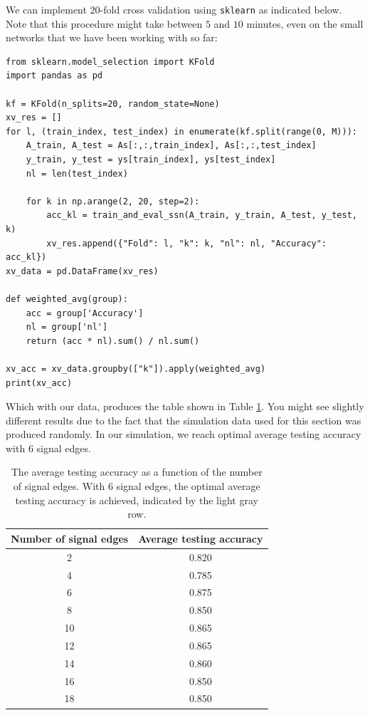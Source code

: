 We can implement $20$-fold cross validation using \texttt{sklearn} as indicated below. Note that this procedure might take between $5$ and $10$ minutes, even on the small networks that we have been working with so far:

\begin{lstlisting}[style=python]
from sklearn.model_selection import KFold
import pandas as pd

kf = KFold(n_splits=20, random_state=None)
xv_res = []
for l, (train_index, test_index) in enumerate(kf.split(range(0, M))):
    A_train, A_test = As[:,:,train_index], As[:,:,test_index]
    y_train, y_test = ys[train_index], ys[test_index]
    nl = len(test_index)
    
    for k in np.arange(2, 20, step=2):
        acc_kl = train_and_eval_ssn(A_train, y_train, A_test, y_test, k)
        xv_res.append({"Fold": l, "k": k, "nl": nl, "Accuracy": acc_kl})
xv_data = pd.DataFrame(xv_res)

def weighted_avg(group):
    acc = group['Accuracy']
    nl = group['nl']
    return (acc * nl).sum() / nl.sum()

xv_acc = xv_data.groupby(["k"]).apply(weighted_avg)
print(xv_acc)
\end{lstlisting}

Which with our data, produces the table shown in Table \ref{tab:ch9:ssn_fold}. You might see slightly different results due to the fact that the simulation data used for this section was produced randomly. In our simulation, we reach optimal average testing accuracy with $6$ signal edges.

\begin{table}
\centering
\begin{tabular}{c|c}
    Number of signal edges & Average testing accuracy  \\
    \hline
    2 & 0.820\\
    4 & 0.785\\
    \rowcolor{lightgray!40} 6 & 0.875\\
    8 & 0.850\\
    10 & 0.865\\
    12 & 0.865\\
    14 & 0.860\\
    16 & 0.850 \\
    18 & 0.850 \\
    \hline
\end{tabular}
\caption{The average testing accuracy as a function of the number of signal edges. With $6$ signal edges, the optimal average testing accuracy is achieved, indicated by the light gray row.}
\label{tab:ch9:ssn_fold}
\end{table}

